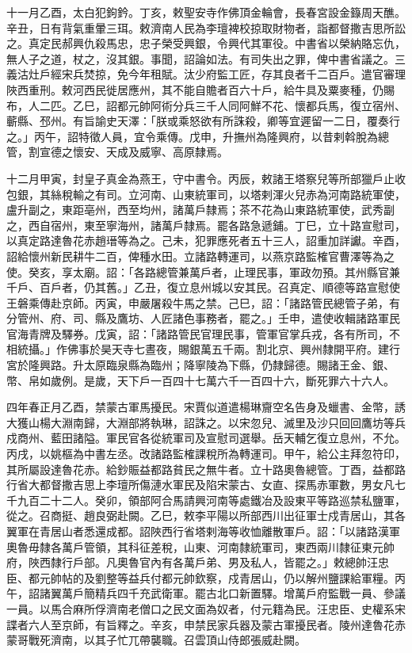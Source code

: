 \begin{pinyinscope}
 十一月乙酉，太白犯鉤鈐。丁亥，敕聖安寺作佛頂金輪會，長春宮設金籙周天醮。辛丑，日有背氣重暈三珥。敕濟南人民為李璮裨校掠取財物者，詣都督撒吉思所訟之。真定民郝興仇殺馬忠，忠子榮受興銀，令興代其軍役。中書省以榮納賂忘仇，無人子之道，杖之，沒其銀。事聞，詔論如法。有司失出之罪，俾中書省議之。三義沽灶戶經宋兵焚掠，免今年租賦。汰少府監工匠，存其良者千二百戶。遣官審理陜西重刑。敕河西民徙居應州，其不能自贍者百六十戶，給牛具及粟麥種，仍賜布，人二匹。乙巳，詔都元帥阿術分兵三千人同阿鮮不花、懷都兵馬，復立宿州、蘄縣、邳州。有旨諭史天澤：「朕或乘怒欲有所誅殺，卿等宜遲留一二日，覆奏行之。」丙午，詔特徵人員，宜令乘傳。戊申，升撫州為隆興府，以昔剌斡脫為總管，割宣德之懷安、天成及威寧、高原隸焉。



 十二月甲寅，封皇子真金為燕王，守中書令。丙辰，敕諸王塔察兒等所部獵戶止收包銀，其絲稅輸之有司。立河南、山東統軍司，以塔剌渾火兒赤為河南路統軍使，盧升副之，東距亳州，西至均州，諸萬戶隸焉；茶不花為山東路統軍使，武秀副之，西自宿州，東至寧海州，諸萬戶隸焉。罷各路急遞鋪。丁巳，立十路宣慰司，以真定路達魯花赤趙瑨等為之。己未，犯罪應死者五十三人，詔重加詳讞。辛酉，詔給懷州新民耕牛二百，俾種水田。立諸路轉運司，以燕京路監榷官曹澤等為之使。癸亥，享太廟。詔：「各路總管兼萬戶者，止理民事，軍政勿預。其州縣官兼千戶、百戶者，仍其舊。」乙丑，復立息州城以安其民。召真定、順德等路宣慰使王磐乘傳赴京師。丙寅，申嚴屠殺牛馬之禁。己巳，詔：「諸路管民總管子弟，有分管州、府、司、縣及鷹坊、人匠諸色事務者，罷之。」壬申，遣使收輯諸路軍民官海青牌及驛券。戊寅，詔：「諸路管民官理民事，管軍官掌兵戎，各有所司，不相統攝。」作佛事於昊天寺七晝夜，賜銀萬五千兩。割北京、興州隸開平府。建行宮於隆興路。升太原臨泉縣為臨州；降寧陵為下縣，仍隸歸德。賜諸王金、銀、幣、帛如歲例。是歲，天下戶一百四十七萬六千一百四十六，斷死罪六十六人。



 四年春正月乙酉，禁蒙古軍馬擾民。宋賈似道遣楊琳齎空名告身及蠟書、金幣，誘大獲山楊大淵南歸，大淵部將執琳，詔誅之。以宋忽兒、滅里及沙只回回鷹坊等兵戍商州、藍田諸隘。軍民官各從統軍司及宣慰司選舉。岳天輔乞復立息州，不允。丙戌，以姚樞為中書左丞。改諸路監榷課稅所為轉運司。甲午，給公主拜忽符印，其所屬設達魯花赤。給鈔賑益都路貧民之無牛者。立十路奧魯總管。丁酉，益都路行省大都督撒吉思上李璮所傷漣水軍民及陷宋蒙古、女直、探馬赤軍數，男女凡七千九百二十二人。癸卯，領部阿合馬請興河南等處鐵冶及設東平等路巡禁私鹽軍，從之。召商挺、趙良弼赴闕。乙巳，敕李平陽以所部西川出征軍士戍青居山，其各翼軍在青居山者悉還成都。詔陜西行省塔剌海等收恤離散軍戶。詔：「以諸路漢軍奧魯毋隸各萬戶管領，其科征差稅，山東、河南隸統軍司，東西兩川隸征東元帥府，陜西隸行戶部。凡奧魯官內有各萬戶弟、男及私人，皆罷之。」敕總帥汪忠臣、都元帥帖的及劉整等益兵付都元帥欽察，戍青居山，仍以解州鹽課給軍糧。丙午，詔諸翼萬戶簡精兵四千充武衛軍。罷古北口新置驛。增萬戶府監戰一員、參議一員。以馬合麻所俘濟南老僧口之民文面為奴者，付元籍為民。汪忠臣、史權系宋諜者六人至京師，有旨釋之。辛亥，申禁民家兵器及蒙古軍擾民者。陵州達魯花赤蒙哥戰死濟南，以其子忙兀帶襲職。召雲頂山侍郎張威赴闕。




\end{pinyinscope}
